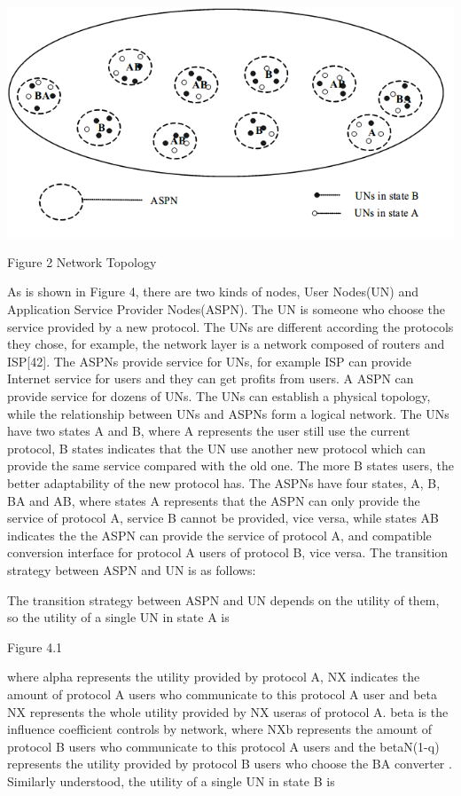 \documentclass{article}
\begin{document}
\par
\centerline{\includegraphics[width=.5\textwidth]{Figure2.png}}
\centerline{Figure 2 Network Topology}

As is shown in Figure 4, there are two kinds of nodes, User Nodes(UN) and Application Service Provider Nodes(ASPN).
The UN is someone who choose the service provided by a new protocol. The UNs are different according the protocols 
they chose, for example, the network layer is a network composed of routers and ISP[42]. The ASPNs provide service 
for UNs, for example ISP can provide Internet service for users and they can get profits from users. A ASPN can provide 
service for dozens of UNs. The UNs can establish a physical topology, while the relationship between UNs and ASPNs form 
a logical network. The UNs have two states A and B, where A represents the user still use the current protocol, B states indicates
that the UN use another new protocol which can provide the same service compared with the old one.  The more B states users,
the better adaptability of the new protocol has. The ASPNs have four states, A, B, BA and AB, where states A represents
that the ASPN can only provide the service of protocol A, service B cannot be provided, vice versa, while states AB
indicates the the ASPN can provide the service of protocol A, and compatible conversion interface for protocol A
users of protocol B, vice versa.
The transition strategy between ASPN and UN is as follows:

The transition strategy between ASPN and UN depends on the utility of them, so the utility of a single UN in state A is

Figure 4.1

where alpha represents the utility provided by protocol A, NX indicates the amount of protocol A users who communicate to
this protocol A user and beta NX represents the whole utility provided by NX useras of protocol A.  beta is the influence
coefficient controls by network, where NXb represents the amount of protocol B users who communicate to this protocol A
users and the betaN(1-q) represents the utility provided by protocol B users who choose the BA converter . Similarly
understood, the utility of a single UN in state B is
\end{document}
